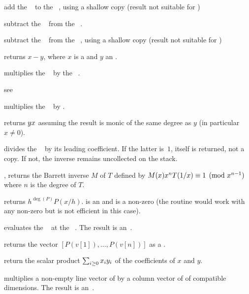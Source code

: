  add the ~
to the ~, using a shallow copy (result not suitable for
)

 subtract the ~ from
the ~.

 subtract the
~ from the ~, using a shallow copy (result not
suitable for )

 returns $x - y$, where $x$ is
a  and $y$ an .

 multiplies the ~
by the ~.

 see 

 multiplies the ~
by .

 returns $y\*x$ assuming the
result is monic of the same degree as $y$ (in particular $x\neq 0$).


 divides the ~ by its
leading coefficient. If the latter is~$1$,  itself is returned, not a
copy. If not, the inverse remains uncollected on the stack.

, returns the Barrett inverse
$M$ of $T$ defined by $M(x)\*x^n\*T(1/x)\equiv 1\pmod{x^{n-1}}$ where $n$ is
the degree of $T$.

 returns $h^{\deg(P)} P(x/h)$.
 is an  and  is a non-zero  (the routine would
work with any non-zero  but is not efficient in this case).

 evaluates the ~
at the ~. The result is an~.

 returns the vector
$[P(v[1]),\ldots,P(v[n])]$ as a .

 return the scalar product
$\sum_{i\geq 0} x_i\*y_i$ of the coefficients of $x$ and $y$.

 multiplies a non-empty line
vector of by a column vector of  of compatible dimensions.
The result is an~.

